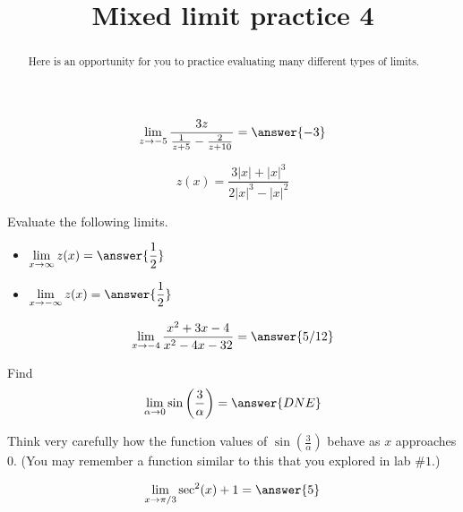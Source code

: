 \documentclass[handout]{ximera}
\title{Mixed limit practice 4}
\begin{document}
\begin{abstract}
Here is an opportunity for you to practice evaluating many different types of limits. 
\end{abstract}
\maketitle

\begin{exercise}
\[\lim_{z \to -5} \frac{3z}{\frac{1}{z+5}-\frac{2}{z+10}} = \answer{-3}\]
\end{exercise}

\begin{exercise}
\[
z(x) = \frac{3|x|+|x|^3}{2|x|^3 - |x|^2}
\]

Evaluate the following limits.  

\begin{itemize}

\item $\displaystyle\lim_{x \to \infty} z(x) = \answer{\frac{1}{2}}$

\item $\displaystyle\lim_{x \to -\infty} z(x) = \answer{\frac{1}{2}}$

\end{itemize}

\end{exercise}

\begin{exercise}
\[\lim_{x \to -4} \frac{x^2+3x-4}{x^2-4x-32} = \answer{5/12}\]
\end{exercise}

\begin{exercise}
Find
\[
\lim_{\alpha \to 0} \sin\left(\frac{3}{\alpha}\right)
= \answer{DNE}
\]

\begin{hint}
Think very carefully how the function values of $\sin\left(\frac{3}{\alpha}\right)$ behave as $x$ approaches 0.  (You may remember a function similar to this that you explored in lab $\# 1$.) 
\end{hint}

\end{exercise}


\begin{exercise}
\[\lim_{x \to \pi/3} \sec^2(x)+1 = \answer{5}\]
\end{exercise}
\end{document}
